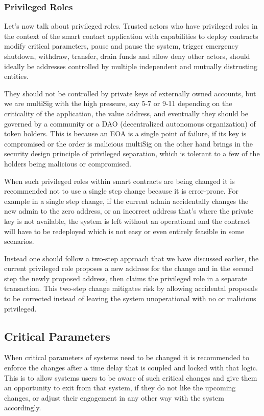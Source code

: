 \subsubsection{Privileged Roles}\label{privileged-roles}

Let's now talk about privileged roles. Trusted actors who have
privileged roles in the context of the smart contact application with
capabilities to deploy contracts modify critical parameters, pause and
pause the system, trigger emergency shutdown, withdraw, transfer, drain
funds and allow deny other actors, should ideally be addresses
controlled by multiple independent and mutually distrusting entities.

They should not be controlled by private keys of externally owned
accounts, but we are multiSig with the high pressure, say 5-7 or 9-11
depending on the criticality of the application, the value address, and
eventually they should be governed by a community or a DAO
(decentralized autonomous organization) of token holders. This is
because an EOA is a single point of failure, if its key is compromised
or the order is malicious multiSig on the other hand brings in the
security design principle of privileged separation, which is tolerant to
a few of the holders being malicious or compromised.

When such privileged roles within smart contracts are being changed it
is recommended not to use a single step change because it is
error-prone. For example in a single step change, if the current admin
accidentally changes the new admin to the zero address, or an incorrect
address that's where the private key is not available, the system is
left without an operational and the contract will have to be redeployed
which is not easy or even entirely feasible in some scenarios.

Instead one should follow a two-step approach that we have discussed
earlier, the current privileged role proposes a new address for the
change and in the second step the newly proposed address, then claims
the privileged role in a separate transaction. This two-step change
mitigates risk by allowing accidental proposals to be corrected instead
of leaving the system unoperational with no or malicious privileged.

\subsection{Critical Parameters}\label{critical-parameters}

When critical parameters of systems need to be changed it is recommended
to enforce the changes after a time delay that is coupled and locked
with that logic. This is to allow systems users to be aware of such
critical changes and give them an opportunity to exit from that system,
if they do not like the upcoming changes, or adjust their engagement in
any other way with the system accordingly.

